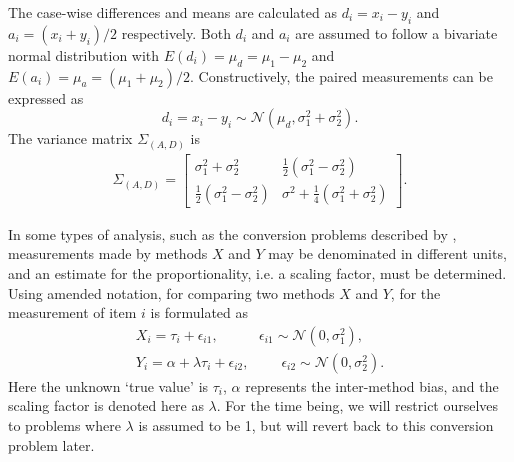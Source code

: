 \documentclass[12pt, a4paper]{report}
\theoremstyle{plain}
\theoremstyle{definition}
\theoremstyle{remark}
\begin{document}
The case-wise differences and means are calculated as $d_{i} =
x_{i}-y_{i}$ and $a_{i} = (x_{i}+y_{i})/2$  respectively.  Both
$d_{i}$ and $a_{i}$ are assumed to follow a bivariate normal
distribution with $E(d_{i})= \mu_{d} = \mu_{1} - \mu_{2}$ and
$E(a_{i})= \mu_{a} = (\mu_{1} + \mu_{2})/2$. Constructively, the paired measurements can be expressed as
\[ d_{i} = x_{i} - y_{i} \sim \mathcal{N} (\mu_d, \sigma^2_{1} + \sigma^2_{2}). \] The variance matrix
$\Sigma_{(A,D)}$ is
\begin{eqnarray}
\Sigma_{(A,D)}= \left[\begin{matrix}
\sigma^{2}_{1}+\sigma^{2}_{2}&\frac{1}{2}(\sigma^{2}_{1}-\sigma^{2}_{2})\\
\frac{1}{2}(\sigma^{2}_{1}-\sigma^{2}_{2})&\sigma^{2}+
\frac{1}{4}(\sigma^{2}_{1}+\sigma^{2}_{2})
\end{matrix} \right].
\end{eqnarray}


%	

In some types of analysis, such as the conversion problems described by \citet{lewis}, measurements made by methods $X$ and $Y$ may be denominated in different units, and an estimate for the proportionality, i.e. a scaling factor, must be determined. Using amended notation, for comparing two methods $X$ and $Y$, for the measurement of item $i$ is formulated as
\begin{eqnarray}
X_i = \tau_i + \epsilon_{i1}, \phantom{spacin} \epsilon_{i1} \sim \mathcal{N}(0,\sigma^2_1),\\
Y_i = \alpha + \lambda \tau_i + \epsilon_{i2}, \phantom{spaci}  \epsilon_{i2} \sim \mathcal{N}(0,\sigma^2_2).
\end{eqnarray}
Here the unknown `true value' is $\tau_i$, $\alpha$ represents the inter-method bias, and the scaling factor is denoted here as $\lambda$. For the time being, we will restrict ourselves to problems where $\lambda$ is assumed to be 1, but will revert back to this conversion problem later. 
  
\end{document}
